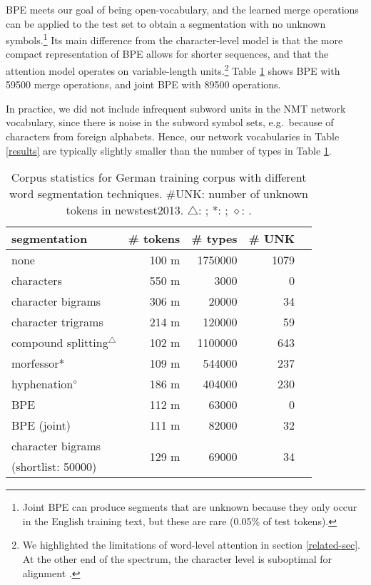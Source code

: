 \documentclass[11pt]{article}
\begin{document}
BPE meets our goal of being open-vocabulary, and the learned merge operations can be applied to the test set to obtain a segmentation with no unknown symbols.\footnote{Joint BPE can produce segments that are unknown because they only occur in the English training text, but these are rare (0.05\% of test tokens).}
Its main difference from the character-level model is that the more compact representation of BPE allows for shorter sequences, and that the attention model operates on variable-length units.\footnote{We highlighted the limitations of word-level attention in section \ref{related-sec}. At the other end of the spectrum, the character level is suboptimal for alignment \cite{Tiedemann474916}.}
Table \ref{splitting} shows BPE with \num{59500} merge operations, and joint BPE with \num{89500} operations.

In practice, we did not include infrequent subword units in the NMT network vocabulary, since there is noise in the subword symbol sets, e.g.\ because of characters from foreign alphabets.
Hence, our network vocabularies in Table \ref{results} are typically slightly smaller than the number of types in Table \ref{splitting}.

\begin{table}
\centering
\small{
\begin{tabular}{lrrrr}
segmentation & \# tokens & \# types &\# UNK \\
\hline
none & 100 m & \num{1750000} & 1079 \\
characters & 550 m & \num{3000} & 0\\
character bigrams & 306 m & \num{20000} & 34\\
character trigrams & 214 m & \num{120000} & 59 \\
\hline
compound splitting$^\triangle$ & 102 m & \num{1100000} & 643 \\
morfessor* & 109 m & \num{544000} & 237\\
hyphenation$^\diamond$ & 186 m & \num{404000} & 230\\
\hline
BPE & 112 m & \num{63000} & 0 \\
BPE (joint) & 111 m & \num{82000} & 32 \\
\hline
character bigrams & \multirow{2}{*}{129 m} & \multirow{2}{*}{\num{69000}} & \multirow{2}{*}{34} \\
(shortlist: \num{50000}) \\
\end{tabular}}
\caption{Corpus statistics for German training corpus with different word segmentation techniques. \#UNK: number of unknown tokens in newstest2013. $\triangle$: \cite{koehn03b}; *: \cite{creutz-lagus:2002:ACL02-MPL}; $\diamond$: \cite{Liang:151530}.}
\label{splitting}
\end{table}
\end{document}
